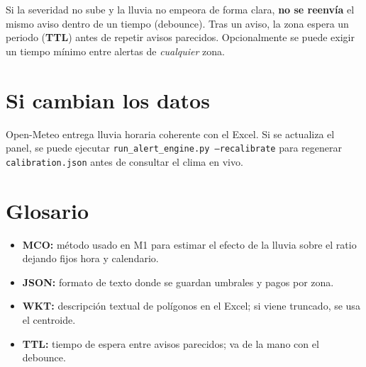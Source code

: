 \documentclass[11pt,a4paper]{article}
\begin{document}
\noindent Si la severidad no sube y la lluvia no empeora de forma clara, \textbf{no se reenvía} el mismo aviso dentro de un tiempo (debounce). Tras un aviso, la zona espera un periodo (\textbf{TTL}) antes de repetir avisos parecidos. Opcionalmente se puede exigir un tiempo mínimo entre alertas de \emph{cualquier} zona.

\section*{Si cambian los datos}

\noindent Open-Meteo entrega lluvia horaria coherente con el Excel. Si se actualiza el panel, se puede ejecutar \texttt{run\_alert\_engine.py --recalibrate} para regenerar \texttt{calibration.json} antes de consultar el clima en vivo.

\section*{Glosario}

\begin{itemize}
  \item \textbf{MCO:} método usado en M1 para estimar el efecto de la lluvia sobre el ratio dejando fijos hora y calendario.
  \item \textbf{JSON:} formato de texto donde se guardan umbrales y pagos por zona.
  \item \textbf{WKT:} descripción textual de polígonos en el Excel; si viene truncado, se usa el centroide.
  \item \textbf{TTL:} tiempo de espera entre avisos parecidos; va de la mano con el debounce.
\end{itemize}
\end{document}
